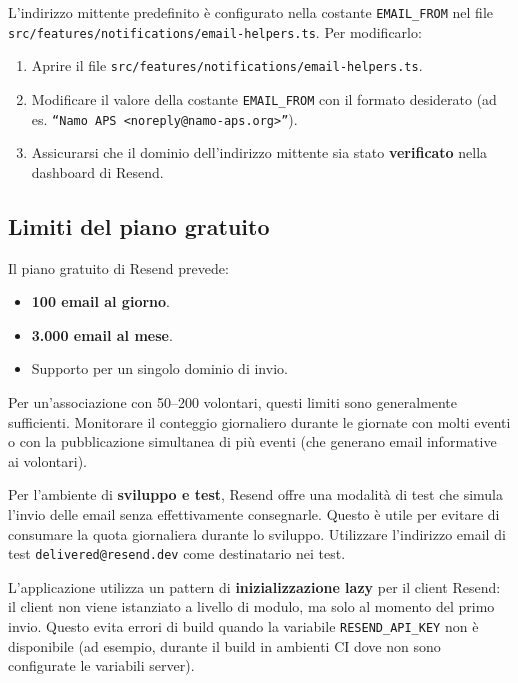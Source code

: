 \documentclass[a4paper,11pt,oneside]{book}
\begin{document}
L'indirizzo mittente predefinito \`e configurato nella costante \texttt{EMAIL\_FROM} nel file \texttt{src/features/notifications/email-helpers.ts}. Per modificarlo:

\begin{enumerate}[leftmargin=1.5em]
  \item Aprire il file \texttt{src/features/notifications/email-helpers.ts}.
  \item Modificare il valore della costante \texttt{EMAIL\_FROM} con il formato desiderato (ad es. \texttt{``Namo APS <noreply@namo-aps.org>''}).
  \item Assicurarsi che il dominio dell'indirizzo mittente sia stato \textbf{verificato} nella dashboard di Resend.
\end{enumerate}

\subsection{Limiti del piano gratuito}

Il piano gratuito di Resend prevede:

\begin{itemize}[leftmargin=1.5em]
  \item \textbf{100 email al giorno}.
  \item \textbf{3.000 email al mese}.
  \item Supporto per un singolo dominio di invio.
\end{itemize}

Per un'associazione con 50--200 volontari, questi limiti sono generalmente sufficienti. Monitorare il conteggio giornaliero durante le giornate con molti eventi o con la pubblicazione simultanea di pi\`u eventi (che generano email informative ai volontari).

\begin{tipbox}
Per l'ambiente di \textbf{sviluppo e test}, Resend offre una modalit\`a di test che simula l'invio delle email senza effettivamente consegnarle. Questo \`e utile per evitare di consumare la quota giornaliera durante lo sviluppo. Utilizzare l'indirizzo email di test \texttt{delivered@resend.dev} come destinatario nei test.
\end{tipbox}

\begin{warningbox}
L'applicazione utilizza un pattern di \textbf{inizializzazione lazy} per il client Resend: il client non viene istanziato a livello di modulo, ma solo al momento del primo invio. Questo evita errori di build quando la variabile \texttt{RESEND\_API\_KEY} non \`e disponibile (ad esempio, durante il build in ambienti CI dove non sono configurate le variabili server).
\end{warningbox}
\end{document}

